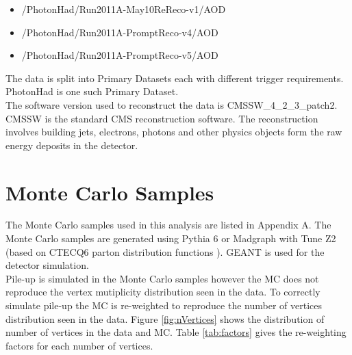 \begin{itemize}
\item /PhotonHad/Run2011A-May10ReReco-v1/AOD %
\item /PhotonHad/Run2011A-PromptReco-v4/AOD %
\item /PhotonHad/Run2011A-PromptReco-v5/AOD %
\end{itemize}

The data is split into Primary Datasets each with different trigger
requirements. PhotonHad is one such Primary Dataset. \\

The software version used to reconstruct the data is CMSSW\_4\_2\_3\_patch2. 
CMSSW is the standard CMS reconstruction software. The reconstruction involves 
building jets, electrons, photons and other physics objects form the raw energy 
deposits in the detector.

\section{Monte Carlo Samples}
\label{sec:Monte_Carlo_Samples}

The Monte Carlo samples used in this analysis are listed in Appendix A. The 
Monte Carlo samples are generated using Pythia 6 \cite{pythia6} or Madgraph
\cite{madgraph} with Tune Z2 (based on CTECQ6 parton distribution functions 
\cite{tuneZ2}). GEANT \cite{geant} is used for the detector simulation. \\

Pile-up is simulated in the Monte Carlo samples however the MC does not
reproduce the vertex mutiplicity distribution seen in the data. To correctly
simulate pile-up the MC is re-weighted to reproduce the number of vertices
distribution seen in the data. Figure \ref{fig:nVertices} shows the distribution
of number of vertices in the data and MC. 
Table \ref{tab:factors}
gives the re-weighting factors for each number of vertices. \\

